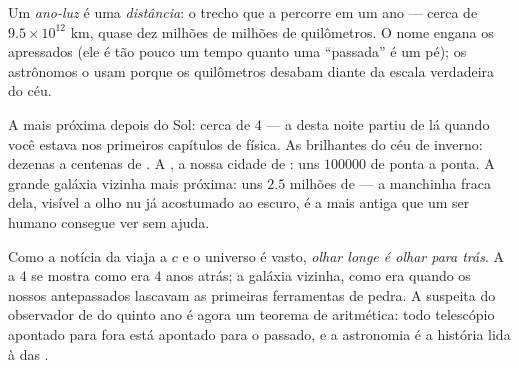 \begin{definition}\label{def:g8:speed-of-light:lightyear}
Um \emph{ano-luz} é uma \emph{distância}: o trecho que
a  percorre em um ano --- cerca de $9.5 \times 10^{12}$ km, quase
dez milhões de milhões de quilômetros. O nome engana os apressados
(ele é tão pouco um tempo quanto uma ``passada'' é um pé); os
astrônomos o usam porque os quilômetros desabam diante da escala
verdadeira do céu.
\end{definition}

\begin{example}\label{ex:g8:speed-of-light:ladder}
A  mais próxima depois do Sol: cerca de $4$  --- a 
desta noite partiu de lá quando você estava nos primeiros capítulos
de física. As  brilhantes do céu de inverno: dezenas a
centenas de . A , a nossa cidade de : uns
$100000$  de ponta a ponta. A grande galáxia vizinha mais
próxima: uns $2.5$ milhões de  --- a manchinha fraca dela,
visível a olho nu já acostumado ao escuro, é a  mais antiga que um
ser humano consegue ver sem ajuda.
\end{example}

\begin{proposition}\label{prop:g8:speed-of-light:timemachine}
Como a notícia da  viaja a $c$ e o universo é vasto, \emph{olhar
longe é olhar para trás}. A  a $4$  se mostra como era
$4$ anos atrás; a galáxia vizinha, como era quando os nossos
antepassados lascavam as primeiras ferramentas de pedra. A suspeita
do observador de  do quinto ano é agora um teorema de
aritmética: todo telescópio apontado para fora está apontado para o
passado, e a astronomia é a história lida à  das .
\end{proposition}

